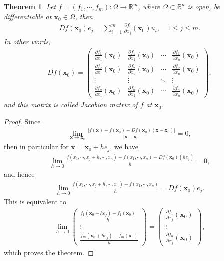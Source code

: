 \documentclass[10pt]{book}
\newtheorem{theorem}{Theorem}[chapter]
\theoremstyle{definition}
\numberwithin{equation}{chapter}
\begin{document}
\begin{theorem}\label{th_75}
Let $f = (f_1, \cdots, f_m): \Omega \to \mathbb{R}^m$, where $\Omega \subset \mathbb{R}^n$ is open, be differentiable at $\mathbf{x}_0 \in \Omega$, then
\begin{align}\label{th_75_equ1}
    Df(\mathbf{x}_0)e_j = \sum^m_{i=1} \frac{\partial f_i}{\partial x_j}(\mathbf{x}_0) u_i, \quad 1 \leq j \leq m.
\end{align}
In other words,
\begin{align*}
    Df(\mathbf{x}_0) = \begin{pmatrix}
        \frac{\partial f_1}{\partial x_1}(\mathbf{x}_0) & \frac{\partial f_1}{\partial x_2}(\mathbf{x}_0) & \cdots & \frac{\partial f_1}{\partial x_n}(\mathbf{x}_0) \\
        \frac{\partial f_2}{\partial x_1}(\mathbf{x}_0) & \frac{\partial f_2}{\partial x_2}(\mathbf{x}_0) & \cdots & \frac{\partial f_2}{\partial x_n}(\mathbf{x}_0) \\
        \vdots & \vdots & \ddots & \vdots \\
        \frac{\partial f_n}{\partial x_1}(\mathbf{x}_0) & \frac{\partial f_n}{\partial x_2}(\mathbf{x}_0) & \cdots & \frac{\partial f_n}{\partial x_n}(\mathbf{x}_0)
    \end{pmatrix},
\end{align*}
and this matrix is called Jacobian matrix of $f$ at $\mathbf{x}_0$.
\end{theorem}
\begin{proof}
Since
\begin{align*}
    \lim_{\mathbf{x} \to \mathbf{x}_0} \frac{\left|f(\mathbf{x}) - f(\mathbf{x}_0) - Df(\mathbf{x}_0) (\mathbf{x} - \mathbf{x}_0)\right|}{\left|\mathbf{x} - \mathbf{x}_0\right|} = 0,
\end{align*}
then in particular for $\mathbf{x} = \mathbf{x}_0 + he_j$, we have
\begin{align*}
    \lim_{h \to 0} \frac{f(x_1,\cdots,x_j+h, \cdots,x_n) - f(x_1,\cdots,x_n) - Df(\mathbf{x}_0)(he_j)}{h} = 0,
\end{align*}
and hence
\begin{align*}
    \lim_{h \to 0} \frac{f(x_1,\cdots,x_j+h, \cdots,x_n) - f(x_1,\cdots,x_n)}{h} = Df(\mathbf{x}_0)e_j.
\end{align*}
This is equivalent to
\begin{align*}
    \lim_{h \to 0} \begin{pmatrix}
        \frac{f_1(\mathbf{x}_0 + he_j) - f_1(\mathbf{x}_0)}{h} \\
        \vdots \\
        \frac{f_m(\mathbf{x}_0 + he_j) - f_m(\mathbf{x}_0)}{h}
    \end{pmatrix} = \begin{pmatrix}
        \frac{\partial f_1}{\partial x_j}(\mathbf{x}_0) \\
        \vdots \\
        \frac{\partial f_n}{\partial x_j}(\mathbf{x}_0)
    \end{pmatrix},
\end{align*}
which proves the theorem.
\end{proof}
\end{document}
